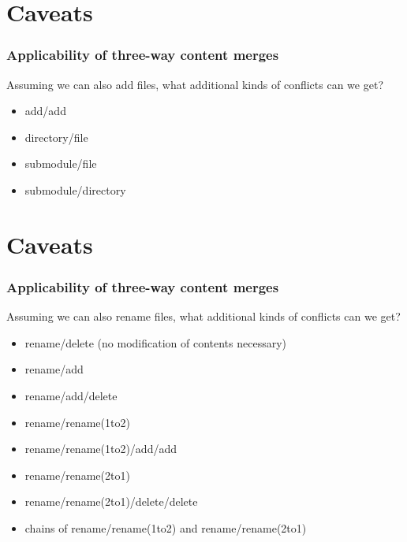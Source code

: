 \documentclass[t]{beamer}
\begin{document}

\section{Caveats}
\begin{frame}
  \frametitle{Applicability of three-way content merges}

  Assuming we can also add files, what additional kinds of conflicts can we get?
  \pause
  \begin{itemize}
    \item add/add
    \pause
    \item directory/file
    \pause
    \item submodule/file
    \pause
    \item submodule/directory
  \end{itemize}

\end{frame}


\section{Caveats}
\begin{frame}
  \frametitle{Applicability of three-way content merges}

  Assuming we can also rename files, what additional kinds of
  conflicts can we get?
  \pause
  \begin{itemize}
    \item rename/delete (no modification of contents necessary)
    \pause
    \item rename/add
    \pause
    \item rename/add/delete
    \pause
    \item rename/rename(1to2)
    \pause
    \item rename/rename(1to2)/add/add
    \pause
    \item rename/rename(2to1)
    \pause
    \item rename/rename(2to1)/delete/delete
    \pause
    \item chains of rename/rename(1to2) and rename/rename(2to1)
  \end{itemize}

\end{frame}

\end{document}
